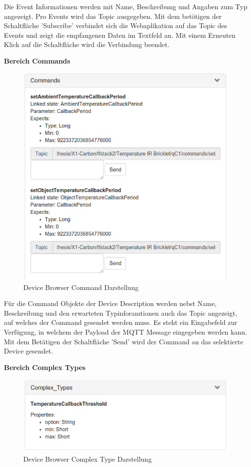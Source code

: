 {Die Event Informationen werden mit Name, Beschreibung und Angaben zum Typ angezeigt. Pro Events wird das Topic ausgegeben. Mit dem betötigen der Schaltfläche 'Subscribe' verbindet sich die Webaplikation auf das Topic des Events und zeigt die empfangenen Daten im Textfeld an. Mit einem Erneuten Klick auf die Schaltfläche wird die Verbindung beendet.

\newpage
\textbf{Bereich Commands}

\begin{figure}[H]
	\centering
        \includegraphics[width=0.7\linewidth]{bilder/device_browser_commands.png} 
    \caption{Device Browser Command Darstellung}
\end{figure}

Für die Command Objekte der Device Description werden nebst Name, Beschreibung und den erwarteten Typinforamtionen auch das Topic angezeigt, auf welches der Command gesendet werden muss. Es steht ein Eingabefeld zur Verfügung, in welchem der Payload der MQTT Message eingegeben werden kann. Mit dem Betätigen der Schaltfläche 'Send' wird der Command an das selektierte Device gesendet.


\textbf{Bereich Complex Types} \\
\begin{figure}[H]
	\centering
        \includegraphics[width=0.7\linewidth]{bilder/device_browser_comptypes.png} 
    \caption{Device Browser Complex Type Darstellung}
\end{figure}

}

